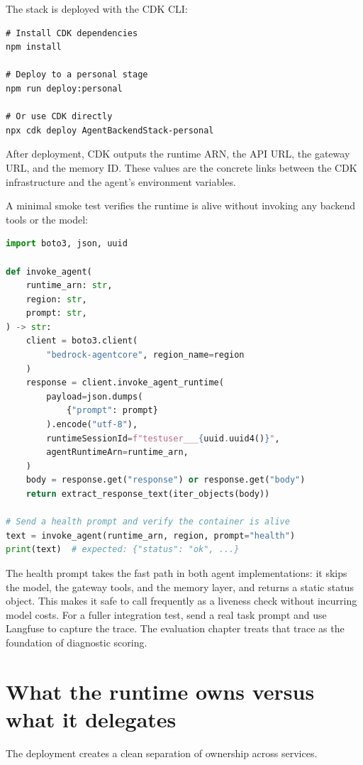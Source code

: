 The stack is deployed with the CDK CLI:

\begin{lstlisting}
# Install CDK dependencies
npm install

# Deploy to a personal stage
npm run deploy:personal

# Or use CDK directly
npx cdk deploy AgentBackendStack-personal
\end{lstlisting}

After deployment, CDK outputs the runtime ARN, the API URL, the gateway URL, and the
memory ID. These values are the concrete links between the CDK infrastructure and the
agent's environment variables.

A minimal smoke test verifies the runtime is alive without invoking any backend tools or
the model:

\begin{lstlisting}[language=Python]
import boto3, json, uuid

def invoke_agent(
    runtime_arn: str,
    region: str,
    prompt: str,
) -> str:
    client = boto3.client(
        "bedrock-agentcore", region_name=region
    )
    response = client.invoke_agent_runtime(
        payload=json.dumps(
            {"prompt": prompt}
        ).encode("utf-8"),
        runtimeSessionId=f"testuser___{uuid.uuid4()}",
        agentRuntimeArn=runtime_arn,
    )
    body = response.get("response") or response.get("body")
    return extract_response_text(iter_objects(body))

# Send a health prompt and verify the container is alive
text = invoke_agent(runtime_arn, region, prompt="health")
print(text)  # expected: {"status": "ok", ...}
\end{lstlisting}

The health prompt takes the fast path in both agent implementations: it skips the model,
the gateway tools, and the memory layer, and returns a static status object. This makes
it safe to call frequently as a liveness check without incurring model costs. For a
fuller integration test, send a real task prompt and use Langfuse to capture the trace.
The evaluation chapter treats that trace as the foundation of diagnostic scoring.

\section{What the runtime owns versus what it delegates}

The deployment creates a clean separation of ownership across services.


